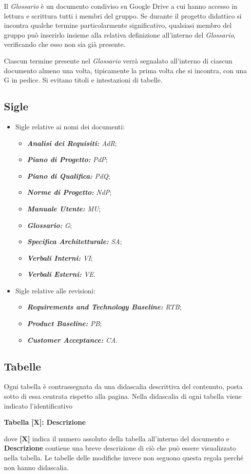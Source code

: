 Il \textit{Glossario} è un documento condiviso su Google Drive a cui hanno accesso in lettura e scrittura tutti i membri del gruppo. Se durante il progetto didattico si incontra qualche termine particolarmente significativo, qualsiasi membro del gruppo può inserirlo insieme alla relativa definizione all'interno del \textit{Glossario}, verificando che esso non sia già presente.

Ciascun termine presente nel \textit{Glossario} verrà segnalato all'interno di ciascun documento almeno una volta, tipicamente la prima volta che si incontra, con una G in pedice. Si evitano titoli e intestazioni di tabelle.

\subsection{Sigle}\label{sec:Sigle}
\begin{itemize}
    \item Sigle relative ai nomi dei documenti:
    \begin{itemize}
        \item \textit{\textbf{Analisi dei Requisiti:} AdR};
        \item \textit{\textbf{Piano di Progetto:} PdP};
        \item \textit{\textbf{Piano di Qualifica:} PdQ};
        \item \textit{\textbf{Norme di Progetto:} NdP};
        \item \textit{\textbf{Manuale Utente:} MU};
        \item \textit{\textbf{Glossario:} G};
        \item \textit{\textbf{Specifica Architetturale:} SA};
        \item \textit{\textbf{Verbali Interni:} VI};
        \item \textit{\textbf{Verbali Esterni:} VE}.
    \end{itemize}
    \item Sigle relative alle revisioni:
    \begin{itemize}
        \item \textit{\textbf{Requirements and Technology Baseline:} RTB};
        \item \textit{\textbf{Product Baseline:} PB};
        \item \textit{\textbf{Customer Acceptance:} CA}.
    \end{itemize}
\end{itemize}
\subsection{Tabelle}
Ogni tabella è contrassegnata da una didascalia descrittiva del contenuto, posta sotto di essa centrata rispetto alla pagina.  Nella didascalia di ogni tabella viene indicato l’identificativo
\begin{center}
    \textbf{Tabella [X]: Descrizione}
\end{center}
dove \textbf{[X]} indica il numero assoluto della tabella all’interno del documento e \textbf{Descrizione} contiene una breve descrizione di ciò che può essere visualizzato nella tabella. Le tabelle delle modifiche invece non seguono questa regola perché non hanno didascalia.

